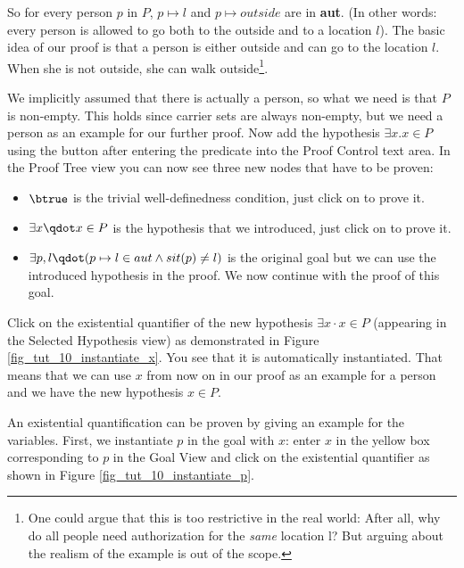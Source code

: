 So for every person $p$ in $P$, $p \mapsto l$ and $p \mapsto outside$ are in \textbf{aut}.
(In other words: every person is allowed to go both to the outside and to a location $l$).
The basic idea of our proof is that a person is either outside and can go to the location $l$.
When she is not outside, she can walk outside\footnote{One could argue that this is too restrictive in the real world: After all, why do all people need authorization for the \textit{same} location l?  But arguing about the realism of the example is out of the scope.}.

We implicitly assumed that there is actually a person, so what we need is that $P$ is non-empty. 
This holds since carrier sets are always non-empty, but we need a person as an example for our further proof. 
Now add the hypothesis $\exists x . x \in P$ using the  button after entering the predicate into the \textsf{Proof Control} text area. 
In the \textsf{Proof Tree} view you can now see three new nodes that have to be proven:
\begin{itemize}
\item $\btrue$ is the trivial well-definedness condition, just click on  to prove it.
\item $\exists x\qdot x\in P$ is the hypothesis that we introduced, just click on  to prove it.
\item $\exists p, l\qdot (p \mapsto  l \in  aut \land  sit(p) \neq  l)$ is the original goal
  but we can use the introduced hypothesis in the proof. We now continue with the proof of this goal.
\end{itemize}

Click on the existential quantifier of the new hypothesis $\exists x \cdot x \in P$
  (appearing in the \textsf{Selected Hypothesis} view) as demonstrated in Figure \ref{fig_tut_10_instantiate_x}.
You see that it is automatically instantiated. That means that we can use $x$ from now on in our proof as an example for a person
  and we have the new hypothesis $x \in P$.


An existential quantification can be proven by giving an example for the variables. First, we
  instantiate $p$ in the goal with $x$: enter $x$ in the yellow box corresponding to $p$ 
  in the \textsf{Goal View} and click on the existential quantifier as shown in Figure \ref{fig_tut_10_instantiate_p}. 

